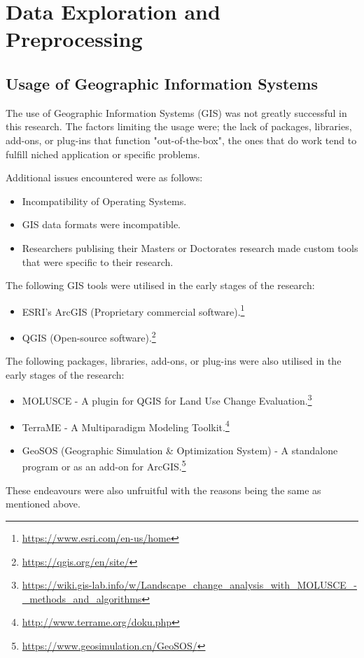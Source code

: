 \section{Data Exploration and Preprocessing}
\subsection{Usage of Geographic Information Systems}
\label{sec:GIS}
The use of Geographic Information Systems (GIS) was not greatly successful in this research. The factors limiting the usage were; the lack of packages, libraries, add-ons, or plug-ins that function "out-of-the-box", the ones that do work tend to fulfill niched application or specific problems.

Additional issues encountered were as follows:
\begin{itemize}
\item Incompatibility of Operating Systems.
\item GIS data formats were incompatible.
\item Researchers publising their Masters or Doctorates research made custom tools that were specific to their research.
\end{itemize}
The following GIS tools were utilised in the early stages of the research:
\begin{itemize}
\item ESRI's ArcGIS (Proprietary commercial software).\footnote{\url{https://www.esri.com/en-us/home}}
\item QGIS (Open-source software).\footnote{\url{https://qgis.org/en/site/}}
\end{itemize}

The following packages, libraries, add-ons, or plug-ins were also utilised in the early stages of the research:
\begin{itemize}
\item MOLUSCE - A plugin for QGIS for Land Use Change Evaluation.\footnote{\url{https://wiki.gis-lab.info/w/Landscape_change_analysis_with_MOLUSCE_-_methods_and_algorithms}}
\item TerraME - A Multiparadigm Modeling Toolkit.\footnote{\url{http://www.terrame.org/doku.php}}
\item GeoSOS (Geographic Simulation \& Optimization System) - A standalone program or as an add-on for ArcGIS.\footnote{\url{https://www.geosimulation.cn/GeoSOS/}}
\end{itemize}
These endeavours were also unfruitful with the reasons being the same as mentioned above.

